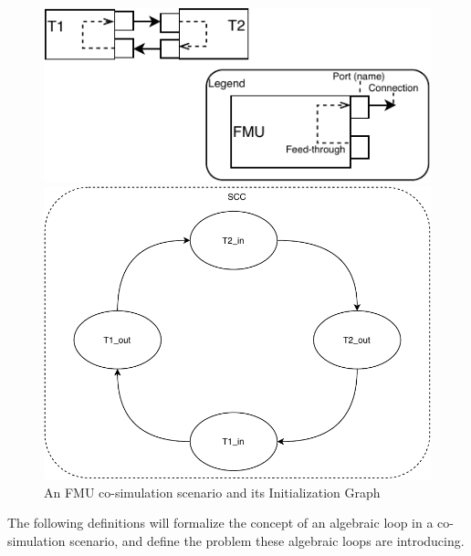 \begin{figure}[H]
    \centering
    \begin{minipage}{0.55\textwidth}
        \centering
    \includegraphics[width=1\textwidth]{images/fmu_cycle.pdf}
    \end{minipage}\hfill
    \begin{minipage}{0.35\textwidth}
        \centering
    \includegraphics[width=1\textwidth]{images/SCC.pdf}
    \end{minipage}
    \caption{An FMU co-simulation scenario and its Initialization Graph}
    \label{fig:fmu_cycle}
\end{figure}

The following definitions will formalize the concept of an algebraic loop in a co-simulation scenario, and define the problem these algebraic loops are introducing. 

